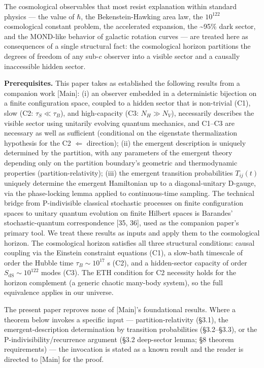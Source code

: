 \documentclass[
]{article}
\begin{document}
The cosmological observables that most resist explanation within
standard physics --- the value of \(\hbar\), the Bekenstein-Hawking area
law, the \(10^{122}\) cosmological constant problem, the accelerated
expansion, the \textasciitilde95\% dark sector, and the MOND-like
behavior of galactic rotation curves --- are treated here as
consequences of a single structural fact: the cosmological horizon
partitions the degrees of freedom of any sub-\(c\) observer into a
visible sector and a causally inaccessible hidden sector.

\textbf{Prerequisites.} This paper takes as established the following
results from a companion work {[}Main{]}: (i) an observer embedded in a
deterministic bijection on a finite configuration space, coupled to a
hidden sector that is non-trivial (C1), slow (C2:
\(\tau_S \ll \tau_B\)), and high-capacity (C3: \(N_H \gg N_V\)),
necessarily describes the visible sector using unitarily evolving
quantum mechanics, and C1--C3 are necessary as well as sufficient
(conditional on the eigenstate thermalization hypothesis for the C2
\(\Leftarrow\) direction); (ii) the emergent description is uniquely
determined by the partition, with any parameters of the emergent theory
depending only on the partition boundary's geometric and thermodynamic
properties (partition-relativity); (iii) the emergent transition
probabilities \(T_{ij}(t)\) uniquely determine the emergent Hamiltonian
up to a diagonal-unitary D-gauge, via the phase-locking lemma applied to
continuous-time sampling. The technical bridge from P-indivisible
classical stochastic processes on finite configuration spaces to unitary
quantum evolution on finite Hilbert spaces is Barandes'
stochastic-quantum correspondence {[}35, 36{]}, used as the companion
paper's primary tool. We treat these results as inputs and apply them to
the cosmological horizon. The cosmological horizon satisfies all three
structural conditions: causal coupling via the Einstein constraint
equations (C1), a slow-bath timescale of order the Hubble time
\(\tau_B \sim 10^{17}\) s (C2), and a hidden-sector capacity of order
\(S_{\text{dS}} \sim 10^{122}\) modes (C3). The ETH condition for C2
necessity holds for the horizon complement (a generic chaotic many-body
system), so the full equivalence applies in our universe.

The present paper reproves none of {[}Main{]}'s foundational results.
Where a theorem below invokes a specific input --- partition-relativity
(§3.1), the emergent-description determination by transition
probabilities (§3.2--§3.3), or the P-indivisibility/recurrence argument
(§3.2 deep-sector lemma; §8 theorem requirements) --- the invocation is
stated as a known result and the reader is directed to {[}Main{]} for
the proof.
\end{document}

